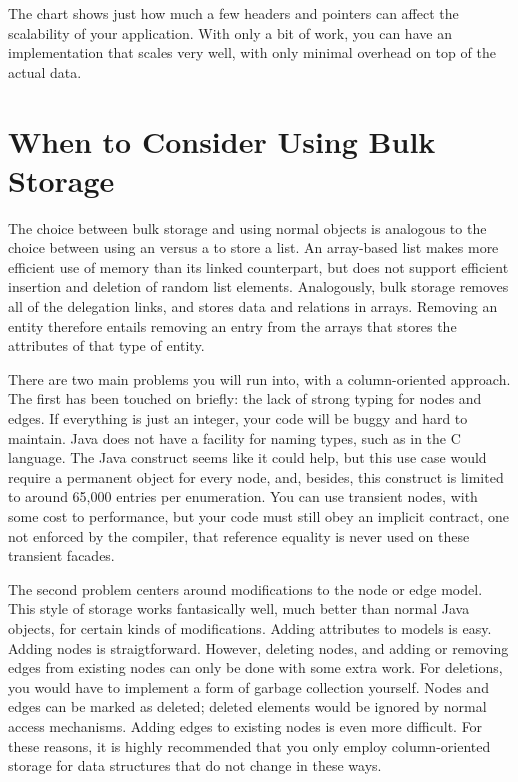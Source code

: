 The chart shows just how much a few headers and pointers can affect the
scalability of your application. With only a bit of work, you can have an
implementation that scales very well, with only minimal overhead on top of the
actual data.





\section{When to Consider Using Bulk Storage}
\label{sec:when-bulk-storage-is-applicable}


The choice between bulk storage and using normal objects is analogous to the
choice between using an  versus a  to store a
list. An array-based list makes more efficient use of memory than its linked
counterpart, but does not support efficient insertion and deletion of random
list elements. Analogously, bulk storage removes all of the delegation links,
and stores data and relations in arrays. Removing an entity therefore entails
removing an entry from the arrays that stores the attributes of that type of
entity.

There are two main problems you will run into, with a column-oriented approach.
The first has been touched on briefly: the lack of strong typing for nodes and
edges. If everything is just an integer, your code will be buggy and hard to
maintain. Java does not have a facility for naming types, such as 
in the C language. The Java  construct seems like it could help, but
this use case would require a permanent object for every node, and, besides,
this construct is limited to around 65,000 entries per enumeration. You can use transient
nodes, with some cost to performance, but your code must still obey an implicit
contract, one not enforced by the  compiler, that reference equality
is never used on these transient facades.

The second problem centers around modifications to the node or edge model. This
style of storage works fantasically well, much better than normal Java objects,
for certain kinds of modifications. Adding attributes to models is easy.
Adding nodes is straigtforward. However, deleting nodes, and adding or
removing edges from existing nodes can only be done with some extra work. For
deletions, you would have to implement a form of garbage collection yourself.
Nodes and edges can be marked as deleted; deleted elements would be ignored by
normal access mechanisms. Adding edges to existing nodes is even more difficult.
For these reasons, it is highly recommended that you only employ column-oriented
storage for data structures that do not change in these ways.


